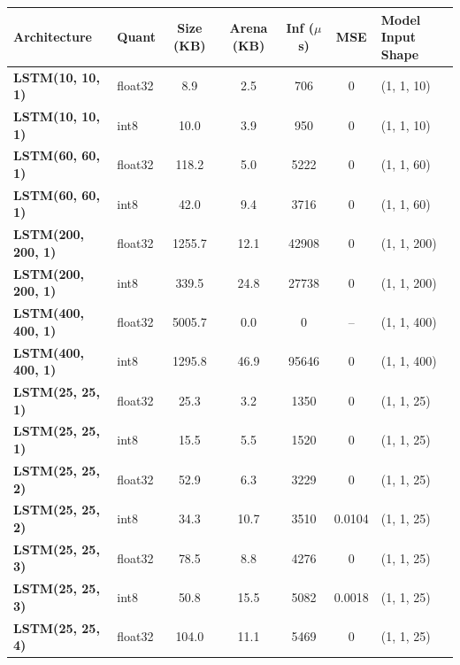 \begin{tabular}{llccccl}
\toprule
\textbf{Architecture} & Quant & Size (KB) & Arena (KB) & Inf ($\mu$s) & MSE & Model Input Shape \\
\midrule
\textbf{LSTM(10, 10, 1)} & float32 & 8.9 & 2.5 & 706 & 0 & (1, 1, 10) \\
\textbf{LSTM(10, 10, 1)} & int8 & 10.0 & 3.9 & 950 & 0 & (1, 1, 10) \\
\textbf{LSTM(60, 60, 1)} & float32 & 118.2 & 5.0 & 5222 & 0 & (1, 1, 60) \\
\textbf{LSTM(60, 60, 1)} & int8 & 42.0 & 9.4 & 3716 & 0 & (1, 1, 60) \\
\textbf{LSTM(200, 200, 1)} & float32 & 1255.7 & 12.1 & 42908 & 0 & (1, 1, 200) \\
\textbf{LSTM(200, 200, 1)} & int8 & 339.5 & 24.8 & 27738 & 0 & (1, 1, 200) \\
\textbf{LSTM(400, 400, 1)} & float32 & 5005.7 & 0.0 & 0 & -- & (1, 1, 400) \\
\textbf{LSTM(400, 400, 1)} & int8 & 1295.8 & 46.9 & 95646 & 0 & (1, 1, 400) \\
\textbf{LSTM(25, 25, 1)} & float32 & 25.3 & 3.2 & 1350 & 0 & (1, 1, 25) \\
\textbf{LSTM(25, 25, 1)} & int8 & 15.5 & 5.5 & 1520 & 0 & (1, 1, 25) \\
\textbf{LSTM(25, 25, 2)} & float32 & 52.9 & 6.3 & 3229 & 0 & (1, 1, 25) \\
\textbf{LSTM(25, 25, 2)} & int8 & 34.3 & 10.7 & 3510 & 0.0104 & (1, 1, 25) \\
\textbf{LSTM(25, 25, 3)} & float32 & 78.5 & 8.8 & 4276 & 0 & (1, 1, 25) \\
\textbf{LSTM(25, 25, 3)} & int8 & 50.8 & 15.5 & 5082 & 0.0018 & (1, 1, 25) \\
\textbf{LSTM(25, 25, 4)} & float32 & 104.0 & 11.1 & 5469 & 0 & (1, 1, 25) \\
\bottomrule
\end{tabular}
